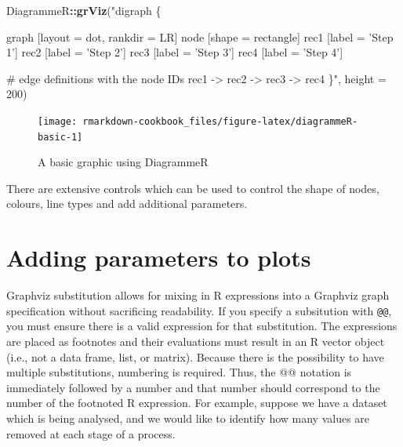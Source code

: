 \documentclass[]{book}
\newenvironment{Shaded}{\begin{snugshade}}{\end{snugshade}}
\newcommand{\KeywordTok}[1]{\textcolor[rgb]{0.13,0.29,0.53}{\textbf{#1}}}
\newcommand{\DataTypeTok}[1]{\textcolor[rgb]{0.13,0.29,0.53}{#1}}
\newcommand{\DecValTok}[1]{\textcolor[rgb]{0.00,0.00,0.81}{#1}}
\newcommand{\StringTok}[1]{\textcolor[rgb]{0.31,0.60,0.02}{#1}}
\newcommand{\OperatorTok}[1]{\textcolor[rgb]{0.81,0.36,0.00}{\textbf{#1}}}
\newcommand{\NormalTok}[1]{#1}
\begin{document}
\begin{Shaded}
\begin{Highlighting}[]
\NormalTok{DiagrammeR}\OperatorTok{::}\KeywordTok{grViz}\NormalTok{(}\StringTok{"digraph \{}

\StringTok{        graph [layout = dot, rankdir = LR]}
\StringTok{        }
\StringTok{        node [shape = rectangle]        }
\StringTok{        rec1 [label = 'Step 1']}
\StringTok{        rec2 [label = 'Step 2']}
\StringTok{        rec3 [label =  'Step 3']}
\StringTok{        rec4 [label = 'Step 4']}

\StringTok{        # edge definitions with the node IDs}
\StringTok{        rec1 -> rec2 -> rec3 -> rec4}
\StringTok{        \}"}\NormalTok{,}
        \DataTypeTok{height =} \DecValTok{200}\NormalTok{)}
\end{Highlighting}
\end{Shaded}

\begin{figure}

{\centering \texttt{[image: rmarkdown-cookbook\_files/figure-latex/diagrammeR-basic-1]} 

}

\caption{A basic graphic using DiagrammeR}\label{fig:diagrammeR-basic}
\end{figure}

There are extensive controls which can be used to control the shape of
nodes, colours, line types and add additional parameters.

\section{Adding parameters to plots}\label{adding-parameters-to-plots}

Graphviz substitution allows for mixing in R expressions into a Graphviz
graph specification without sacrificing readability. If you specify a
subsitution with \texttt{@@}, you must ensure there is a valid
expression for that substitution. The expressions are placed as
footnotes and their evaluations must result in an R vector object (i.e.,
not a data frame, list, or matrix). Because there is the possibility to
have multiple substitutions, numbering is required. Thus, the @@
notation is immediately followed by a number and that number should
correspond to the number of the footnoted R expression. For example,
suppose we have a dataset which is being analysed, and we would like to
identify how many values are removed at each stage of a process.
\end{document}
